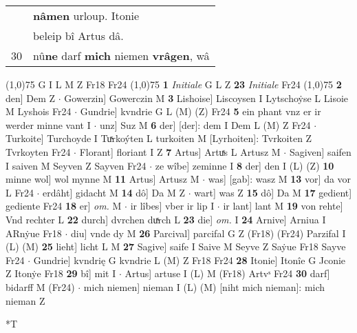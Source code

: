 \documentclass[8pt,a4paper,notitlepage]{article}
\begin{document}
\begin{table}[ht]
\begin{minipage}[t]{0.5\linewidth}
\begin{tabular}{rl}
 & \textbf{nâmen} urloup. Itonie\\ 
 & beleip bî Artus dâ.\\ 
30 & nû\textbf{ne} darf \textbf{mich} niemen \textbf{vrâgen}, wâ\\ 
\end{tabular}
\scriptsize
\line(1,0){75} \newline
G I L M Z Fr18 Fr24 \newline
\line(1,0){75} \newline
\textbf{1} \textit{Initiale} G L Z  \textbf{23} \textit{Initiale} Fr24  \newline
\line(1,0){75} \newline
\textbf{2} den] Dem Z  $\cdot$ Gowerzin] Gowerczin M \textbf{3} Lishoise] Liscoysen I Lytschoẏse L Lisoie M Lyshois Fr24  $\cdot$ Gundrie] kvndrie G L (M) (Z) Fr24 \textbf{5} ein phant vnz er ir werder minne vant I  $\cdot$ unz] Suz M \textbf{6} der] [der]: dem I Dem L (M) Z Fr24  $\cdot$ Turkoite] Turchoyde I Tuͯrkoýten L turkoiten M [Lyrhoiten]: Tvrkoiten Z Tvrkoyten Fr24  $\cdot$ Florant] floriant I Z \textbf{7} Artus] Artuͯs L Artusz M  $\cdot$ Sagiven] saifen I saiven M Seyven Z Sayven Fr24  $\cdot$ ze wîbe] zeminne I \textbf{8} der] den I (L) (Z) \textbf{10} minne wol] wol mynne M \textbf{11} Artus] Artusz M  $\cdot$ was] [gab]: wasz M \textbf{13} vor] da vor L Fr24  $\cdot$ erdâht] gidacht M \textbf{14} dô] Da M Z  $\cdot$ wart] was Z \textbf{15} dô] Da M \textbf{17} gedient] gediente Fr24 \textbf{18} er] \textit{om.} M  $\cdot$ ir lîbes] vber ir lip I  $\cdot$ ir lant] lant M \textbf{19} von rehte] Vnd rechter L \textbf{22} durch] dvrchen duͯrch L \textbf{23} die] \textit{om.} I \textbf{24} Arnive] Arniua I ARnẏue Fr18  $\cdot$ diu] vnde dy M \textbf{26} Parcival] parcifal G Z (Fr18) (Fr24) Parzifal I (L) (M) \textbf{25} lieht] licht L M \textbf{27} Sagive] saife I Saive M Seyve Z Saẏue Fr18 Sayve Fr24  $\cdot$ Gundrie] kvndrię G kvndrie L (M) Z Fr18 Fr24 \textbf{28} Itonie] Itonîe G Jconie Z Itonẏe Fr18 \textbf{29} bî] mit I  $\cdot$ Artus] artuse I (L) M (Fr18) Artvˢ Fr24 \textbf{30} darf] bidarff M (Fr24)  $\cdot$ mich niemen] nieman I (L) (M) [niht mich nieman]: mich nieman  Z \newline
\end{minipage}
\hspace{0.5cm}
\begin{minipage}[t]{0.5\linewidth}
\small
\begin{center}*T
\end{center}
\begin{tabular}{rl}

\end{tabular}
\end{minipage}
\end{table}
\end{document}
